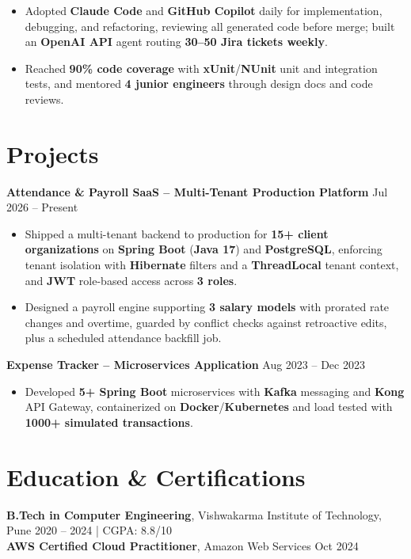 \documentclass[letterpaper,10pt]{article}
\begin{document}
\begin{itemize}
    \item Adopted \textbf{Claude Code} and \textbf{GitHub Copilot} daily for implementation, debugging, and refactoring, reviewing all generated code before merge; built an \textbf{OpenAI API} agent routing \textbf{30--50 Jira tickets weekly}.
    \item Reached \textbf{90\% code coverage} with \textbf{xUnit}/\textbf{NUnit} unit and integration tests, and mentored \textbf{4 junior engineers} through design docs and code reviews.
\end{itemize}

\section*{Projects}

\textbf{Attendance \& Payroll SaaS -- Multi-Tenant Production Platform} \hfill Jul 2026 -- Present
\begin{itemize}
    \item Shipped a multi-tenant backend to production for \textbf{15+ client organizations} on \textbf{Spring Boot} (\textbf{Java 17}) and \textbf{PostgreSQL}, enforcing tenant isolation with \textbf{Hibernate} filters and a \textbf{ThreadLocal} tenant context, and \textbf{JWT} role-based access across \textbf{3 roles}.
    \item Designed a payroll engine supporting \textbf{3 salary models} with prorated rate changes and overtime, guarded by conflict checks against retroactive edits, plus a scheduled attendance backfill job.
\end{itemize}

\textbf{Expense Tracker -- Microservices Application} \hfill Aug 2023 -- Dec 2023
\begin{itemize}
    \item Developed \textbf{5+ Spring Boot} microservices with \textbf{Kafka} messaging and \textbf{Kong} API Gateway, containerized on \textbf{Docker}/\textbf{Kubernetes} and load tested with \textbf{1000+ simulated transactions}.
\end{itemize}

\section*{Education \& Certifications}
\textbf{B.Tech in Computer Engineering}, Vishwakarma Institute of Technology, Pune \hfill 2020 -- 2024 \;|\; CGPA: 8.8/10 \\
\textbf{AWS Certified Cloud Practitioner}, Amazon Web Services \hfill Oct 2024
\end{document}
